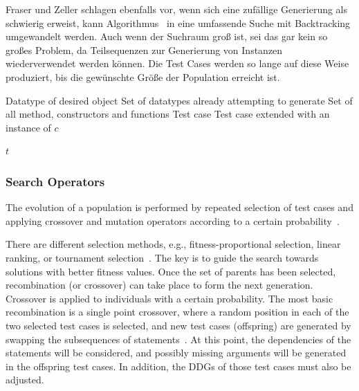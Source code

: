 \documentclass{article}
\newcommand{\Desc}[2]{\State \makebox[2em][l]{#1}#2}
\begin{document}
Fraser und Zeller schlagen ebenfalls vor, wenn sich eine zufällige Generierung als schwierig erweist, kann Algorithmus~ in eine umfassende Suche mit Backtracking umgewandelt werden. Auch wenn der Suchraum groß ist, sei das gar kein so großes Problem, da Teilsequenzen zur Generierung von Instanzen wiederverwendet werden können. Die Test Cases werden so lange auf diese Weise produziert, bis die gewünschte Größe der Population erreicht ist. 

\begin{algorithm}[t]
\caption{$GenObject(c, G, M, t)$}\label{alg:random-generation-of-args}
\begin{algorithmic}
\Input
  \Desc{$c$}{Datatype of desired object}
  \Desc{$G$}{Set of datatypes already attempting to generate}
  \Desc{$M$}{Set of all method, constructors and functions}
  \Desc{$t$}{Test case}
\EndInput
\Output
  \Desc{$t$}{Test case extended with an instance of $c$}
\EndOutput    
{}

  \EndIf
\EndFor
{}
\State \Return $t$
\end{algorithmic}
\end{algorithm}

\subsubsection{Search Operators}
The evolution of a population is performed by repeated selection of test cases and applying crossover and mutation operators according to a certain probability~\cite{Fraser2012}.

There are different selection methods, e.g., fitness-proportional selection, linear ranking, or tournament selection~\cite{McMinn_2004}. The key is to guide the search towards solutions with better fitness values. Once the set of parents has been selected, recombination (or crossover) can take place to form the next generation. Crossover is applied to individuals with a certain probability. The most basic recombination is a single point crossover, where a random position in each of the two selected test cases is selected, and new test cases (offspring) are generated by swapping the subsequences of statements~\cite{Fraser2012}. At this point, the dependencies of the statements will be considered, and possibly missing arguments will be generated in the offspring test cases. In addition, the \acp{DDG} of those test cases must also be adjusted.
\end{document}
